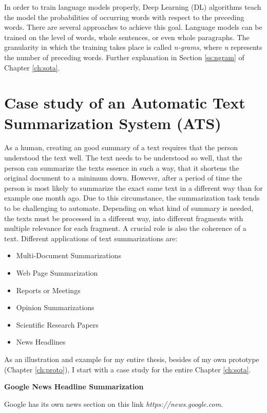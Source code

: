 In order to train language models properly, Deep Learning (DL) algorithms teach the model the probabilities of occurring words with respect to the preceding words. There are several approaches to achieve this goal. Language models can be trained on the level of words, whole sentences, or even whole paragraphs. The granularity in which the training takes place is called \textit{n-grams}, where \textit{n} represents the number of preceding words. Further explanation in Section \ref{ss:ngram} of Chapter \ref{ch:sota}. 


\section{Case study of an Automatic Text Summarization System (ATS)}

As a human, creating an good summary of a text requires that the person understood the text well. The text needs to be understood so well, that the person can summarize the texts essence in such a way, that it shortens the original document to a minimum down. However, after a period of time the person is most likely to summarize the exact same text in a different way than for example one month ago. Due to this circumstance, the summarization task tends to be challenging to automate. Depending on what kind of summary is needed, the texts must be processed in a different way, into different fragments with multiple relevance for each fragment. A crucial role is also the coherence of a text. Different applications of text summarizations are:

\begin{itemize}
	\item Multi-Document Summarizations
	\item Web Page Summarization
	\item Reports or Meetings
	\item Opinion Summarizations
	\item Scientific Research Papers
	\item News Headlines
\end{itemize}

As an illustration and example for my entire thesis, besides of my own prototype (Chapter \ref{ch:proto}), I start with a case study for the entire Chapter \ref{ch:sota}. 

\textbf{Google News Headline Summarization}

Google has its own news section on this link \textit{https://news.google.com}. 



